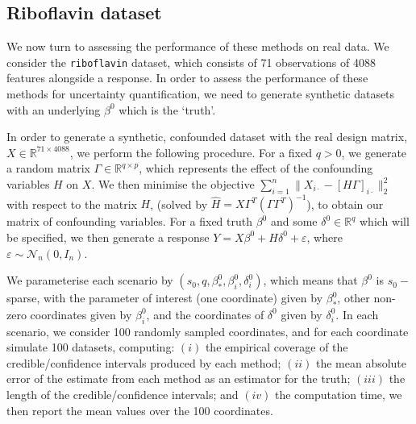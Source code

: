 \documentclass[11pt]{article}
\newcommand{\eps}{\varepsilon}
\newcommand{\R}{\mathbb{R}}
\newcommand{\N}{\mathcal{N}}
\numberwithin{equation}{section}
\begin{document}
\subsection{Riboflavin dataset}
We now turn to assessing the performance of these methods on real data. We consider the \texttt{riboflavin} dataset, which consists of 71 observations of 4088 features alongside a response. In order to assess the performance of these methods for uncertainty quantification, we need to generate synthetic datasets with an underlying $\beta^0$ which is the `truth'. 

In order to generate a synthetic, confounded dataset with the real design matrix, $X \in \R^{71 \times 4088}$, we perform the following procedure. For a fixed $q > 0$, we generate a random matrix $\Gamma \in \R^{q \times p}$, which represents the effect of the confounding variables $H$ on $X$. We then minimise the objective $\sum_{i = 1}^n \|X_{i\cdot} - [H\Gamma]_{i\cdot}\|_2^2$ with respect to the matrix $H$, (solved by $\hat{H} = X  \Gamma^T  (\Gamma  \Gamma^T)^{-1}$), to obtain our matrix of confounding variables. For a fixed truth $\beta^0$ and some $\delta^0 \in \R^q$ which will be specified, we then generate a response $Y = X\beta^0 + H\delta^0 + \eps$, where $\eps \sim \N_n(0, I_n)$. 

We parameterise each scenario by $(s_0, q, \beta_*^0, \beta_i^0, \delta^0_i)$, which means that $\beta^0$ is $s_0-$sparse, with the parameter of interest (one coordinate) given by $\beta_*^0$, other non-zero coordinates given by $\beta_i^0$, and the coordinates of $\delta^0$ given by $\delta_i^0$. In each scenario, we consider 100 randomly sampled coordinates, and for each coordinate simulate 100 datasets, computing: $(i)$ the empirical coverage of the credible/confidence intervals produced by each method; $(ii)$ the mean absolute error of the estimate from each method as an estimator for the truth; $(iii)$ the length of the credible/confidence intervals; and $(iv)$ the computation time, we then report the mean values over the 100 coordinates.
\end{document}
